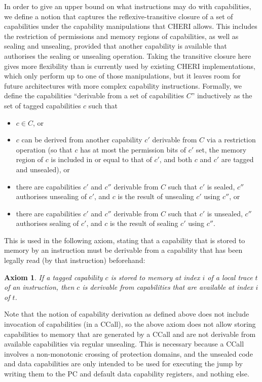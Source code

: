 \documentclass[11pt]{article}
\newtheorem{axiom}{Axiom}
\theoremstyle{definition}
\begin{document}
In order to give an upper bound on what instructions may do with capabilities,
we define a notion that captures the reflexive-transitive closure of a set of
capabilities under the capability manipulations that CHERI allows.
This includes the restriction of
permissions and memory regions of capabilities, as well as sealing and
unsealing, provided that another capability is available that authorises the
sealing or unsealing operation.
Taking the transitive closure here gives more flexibility than is currently
used by existing CHERI implementations, which only perform up to one of those
manipulations, but it leaves room for future architectures with more complex
capability instructions.
Formally, we define the capabilities ``derivable from a
set of capabilities $C$'' inductively as the set of tagged capabilities $c$
such that
\begin{itemize}
	\item $c \in C$, or
	\item $c$ can be derived from another capability $c'$ derivable from $C$ via a
	restriction operation (so that $c$ has at most the permission bits of $c'$ set,
	the memory region of $c$ is included in or equal to that of $c'$, and both $c$ and $c'$ are tagged
	and unsealed), or
	\item there are capabilities $c'$ and $c''$ derivable from $C$ such that $c'$ is sealed,
	$c''$ authorises unsealing of $c'$, and $c$ is the result of unsealing $c'$ using
	$c''$, or
	\item there are capabilities $c'$ and $c''$ derivable from $C$ such that $c'$ is unsealed,
	$c''$ authorises sealing of $c'$, and $c$ is the result of sealing $c'$ using $c''$.
\end{itemize}

This is used in the following axiom, stating that a capability that is stored to memory by
an instruction must be derivable from a capability that has been
legally read (by that instruction)
beforehand:

\begin{axiom}
  If a tagged capability $c$ is stored to memory at index $i$ of a local trace
  $t$ of an instruction, then $c$ is derivable from
  capabilities that are available at index $i$ of $t$.
\end{axiom}

Note that the notion of capability derivation as defined above does not include
invocation of capabilities (in a CCall), so the above axiom does not allow
storing capabilities to memory that are generated by a CCall and are not
derivable from available capabilities via regular unsealing.  This is necessary
because a CCall involves a non-monotonic crossing of protection domains, and
the unsealed code and data capabilities are only intended to be used for
executing the jump by writing them to the PC and default data capability
registers, and nothing else.
\end{document}
